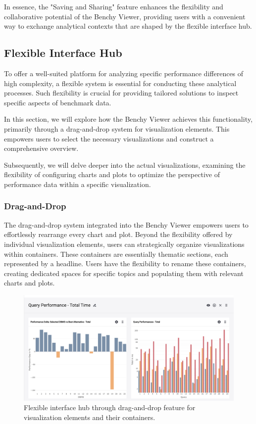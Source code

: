 In essence, the "Saving and Sharing" feature enhances the flexibility and collaborative potential of the Benchy Viewer, providing users with a convenient way to exchange analytical contexts that are shaped by the flexible interface hub.



\subsection{Flexible Interface Hub}

To offer a well-suited platform for analyzing specific performance differences of high complexity, a flexible system is essential for conducting these analytical processes. Such flexibility is crucial for providing tailored solutions to inspect specific aspects of benchmark data.

In this section, we will explore how the Benchy Viewer achieves this functionality, primarily through a drag-and-drop system for visualization elements. This empowers users to select the necessary visualizations and construct a comprehensive overview.

Subsequently, we will delve deeper into the actual visualizations, examining the flexibility of configuring charts and plots to optimize the perspective of performance data within a specific visualization.

\subsubsection{Drag-and-Drop}
The drag-and-drop system integrated into the Benchy Viewer empowers users to effortlessly rearrange every chart and plot. Beyond the flexibility offered by individual visualization elements, users can strategically organize visualizations within containers. These containers are essentially thematic sections, each represented by a headline. Users have the flexibility to rename these containers, creating dedicated spaces for specific topics and populating them with relevant charts and plots.

\begin{figure}[h]
  \centering
  \includegraphics[width=0.8\linewidth]{figures/analytics-drag-and-drop.png}
  \caption{Flexible interface hub through drag-and-drop feature for visualization elements and their containers.}
  \label{fig:analytics-drag-and-drop}
\end{figure}

